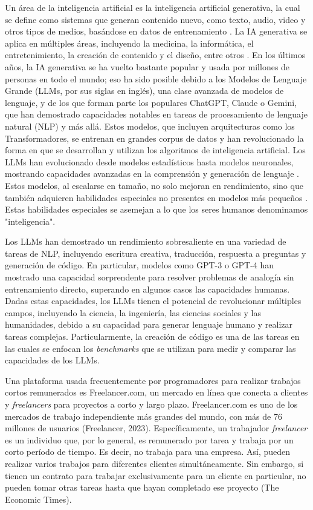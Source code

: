 \documentclass[twocolumn]{article}
\begin{document}
Un área de la inteligencia artificial es la inteligencia artificial generativa, la cual se define como sistemas que generan contenido nuevo, como texto, audio, video y otros tipos de medios, basándose en datos de entrenamiento \parencite{park2023}. La IA generativa se aplica en múltiples áreas, incluyendo la medicina, la informática, el entretenimiento, la creación de contenido y el diseño, entre otros \parencite{kar2023}. En los últimos años, la IA generativa se ha vuelto bastante popular y usada por millones de personas en todo el mundo; eso ha sido posible debido a los Modelos de Lenguaje Grande (LLMs, por sus siglas en inglés), una clase avanzada de modelos de lenguaje, y de los que forman parte los populares ChatGPT, Claude o Gemini, que han demostrado capacidades notables en tareas de procesamiento de lenguaje natural (NLP) y más allá. Estos modelos, que incluyen arquitecturas como los Transformadores, se entrenan en grandes corpus de datos y han revolucionado la forma en que se desarrollan y utilizan los algoritmos de inteligencia artificial. Los LLMs han evolucionado desde modelos estadísticos hasta modelos neuronales, mostrando capacidades avanzadas en la comprensión y generación de lenguaje \parencite{zhao2023}. Estos modelos, al escalarse en tamaño, no solo mejoran en rendimiento, sino que también adquieren habilidades especiales no presentes en modelos más pequeños \parencite{chowdhery2022}. Estas habilidades especiales se asemejan a lo que los seres humanos denominamos "inteligencia".

Los LLMs han demostrado un rendimiento sobresaliente en una variedad de tareas de NLP, incluyendo escritura creativa, traducción, respuesta a preguntas y generación de código. En particular, modelos como GPT-3 o GPT-4 han mostrado una capacidad sorprendente para resolver problemas de analogía sin entrenamiento directo, superando en algunos casos las capacidades humanas. Dadas estas capacidades, los LLMs tienen el potencial de revolucionar múltiples campos, incluyendo la ciencia, la ingeniería, las ciencias sociales y las humanidades, debido a su capacidad para generar lenguaje humano y realizar tareas complejas. Particularmente, la creación de código es una de las tareas en las cuales se enfocan los \emph{benchmarks} que se utilizan para medir y comparar las capacidades de los LLMs.

Una plataforma usada frecuentemente por programadores para realizar trabajos cortos remunerados es Freelancer.com, un mercado en línea que conecta a clientes y \emph{freelancers} para proyectos a corto y largo plazo. Freelancer.com es uno de los mercados de trabajo independiente más grandes del mundo, con más de 76 millones de usuarios (Freelancer, 2023). Específicamente, un trabajador \emph{freelancer} es un individuo que, por lo general, es remunerado por tarea y trabaja por un corto período de tiempo. Es decir, no trabaja para una empresa. Así, pueden realizar varios trabajos para diferentes clientes simultáneamente. Sin embargo, si tienen un contrato para trabajar exclusivamente para un cliente en particular, no pueden tomar otras tareas hasta que hayan completado ese proyecto (The Economic Times).
\end{document}
